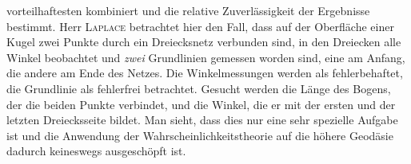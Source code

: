 vorteilhaftesten kombiniert und die relative Zuverlässigkeit der Ergebnisse bestimmt. Herr \textsc{Laplace} betrachtet hier den Fall, dass auf der Oberfläche einer Kugel zwei Punkte durch ein Dreiecksnetz verbunden sind, in den Dreiecken alle Winkel beobachtet und \emph{zwei} Grundlinien gemessen worden sind, eine am Anfang, die andere am Ende des Netzes. Die Winkelmessungen werden als fehlerbehaftet, die Grundlinie als fehlerfrei betrachtet. Gesucht werden die Länge des Bogens, der die beiden Punkte verbindet, und die Winkel, die er mit der ersten und der letzten Dreiecksseite bildet. Man sieht, dass dies nur eine sehr spezielle Aufgabe ist und die Anwendung der Wahrscheinlichkeitstheorie auf die höhere Geodäsie dadurch keineswegs ausgeschöpft ist.
\par\clearpage\endgroup
